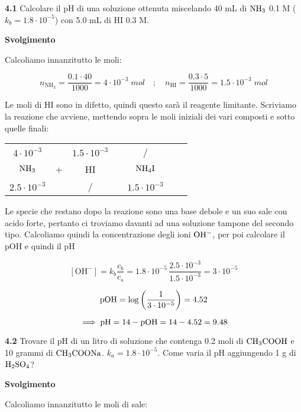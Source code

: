 \textbf{4.1} Calcolare il pH di una soluzione ottenuta miscelando 40 mL di $\rm NH_3$ 0.1 M ($k_b = 1.8 \cdot 10^{-5}$) con 5.0 mL di HI 0.3 M.

\vspace{0.2cm}\large\textbf{Svolgimento}\normalsize

\vspace{0.2cm}Calcoliamo innanzitutto le moli:

$$n_{\text{NH}_3}=\frac{0.1 \cdot 40}{1000}=4 \cdot 10^{-3} \; mol
\quad ; \quad
n_{\text{HI}}=\frac{0.3 \cdot 5}{1000}=1.5 \cdot 10^{-3} \; mol$$

Le moli di HI sono in difetto, quindi questo sarà il reagente limitante. Scriviamo la reazione che avviene, mettendo sopra le moli iniziali dei vari composti e sotto quelle finali:

\begin{center}
    \begin{tabular}{ccccccc}
        $4 \cdot 10^{-3}$ &  & $1.5 \cdot 10^{-3}$ & & /\\
        $\rm NH_3$ & + & HI & \ce{->} & $\rm NH_4I$ \\
        $2.5 \cdot 10^{-3}$ &  &  / & & $1.5 \cdot 10^{-3}$\\
    \end{tabular}
\end{center}

Le specie che restano dopo la reazione sono una base debole e un suo sale con acido forte, pertanto ci troviamo davanti ad una soluzione tampone del secondo tipo. Calcoliamo quindi la concentrazione degli ioni $\rm OH^-$, per poi calcolare il pOH e quindi il pH

$$[\text{OH}^-]=k_b\frac{c_b}{c_s}
=1.8 \cdot 10^{-5}\,\frac{2.5 \cdot 10^{-3}}{1.5 \cdot 10^{-3}}= 3 \cdot 10^{-5}$$

$$\rm pOH=\log\left(\frac{1}{3 \cdot 10^{-5}}\right)=4.52$$

$$\implies \rm pH=14-pOH=14-4.52=9.48$$

\vspace{0.2cm}\textbf{4.2} Trovare il pH di un litro di soluzione che contenga 0.2 moli di $\rm CH_3COOH$ e 10 grammi di $\rm CH_3COONa$. $k_a = 1.8 \cdot 10^{-5}$. Come varia il pH aggiungendo 1 g di $\rm H_2SO_4$?

\vspace{0.2cm}\large\textbf{Svolgimento}\normalsize

\vspace{0.2cm}Calcoliamo innanzitutto le moli di sale:

